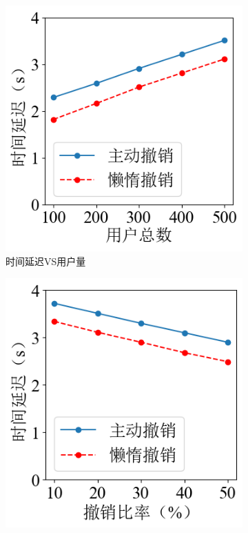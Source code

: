 \documentclass[promaster]{thesis-uestc}
\begin{document}
\begin{figure}[h]
    \centering
    \begin{subfigure}{0.40\textwidth}
        \includegraphics[width=1\linewidth]{pic/user_num.png}
        \centering
        \captionsetup{width=\textwidth}
        \caption{时间延迟VS用户量}
        \label{密钥更新性能1}
    \end{subfigure}
    \begin{subfigure}{0.40\textwidth}
        \includegraphics[width=1\linewidth]{pic/revocation_ratio.png}

\end{subfigure}
\end{figure}
\end{document}
